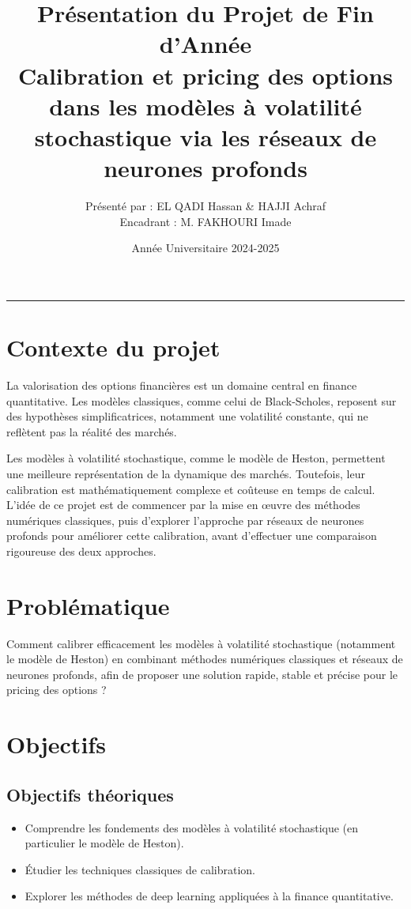 \documentclass[11pt,a4paper]{article}
\title{
    \textbf{Présentation du Projet de Fin d’Année} \\
    \vspace{0.4cm}
    Calibration et pricing des options dans les modèles à volatilité stochastique via les réseaux de neurones profonds
}
\author{
    Présenté par : EL QADI Hassan \& HAJJI Achraf \\
    Encadrant : M. FAKHOURI Imade
}
\date{Année Universitaire 2024-2025}
\begin{document}
\maketitle
\vspace{-1em}
\hrule
\vspace{1em}

\section{Contexte du projet}
La valorisation des options financières est un domaine central en finance quantitative. Les modèles classiques, comme celui de Black-Scholes, reposent sur des hypothèses simplificatrices, notamment une volatilité constante, qui ne reflètent pas la réalité des marchés.

Les modèles à volatilité stochastique, comme le modèle de Heston, permettent une meilleure représentation de la dynamique des marchés. Toutefois, leur calibration est mathématiquement complexe et coûteuse en temps de calcul. L’idée de ce projet est de commencer par la mise en œuvre des méthodes numériques classiques, puis d’explorer l’approche par réseaux de neurones profonds pour améliorer cette calibration, avant d'effectuer une comparaison rigoureuse des deux approches.

\section{Problématique}
Comment calibrer efficacement les modèles à volatilité stochastique (notamment le modèle de Heston) en combinant méthodes numériques classiques et réseaux de neurones profonds, afin de proposer une solution rapide, stable et précise pour le pricing des options ?

\section{Objectifs}
\subsection*{Objectifs théoriques}
\begin{itemize}[label=--]
    \item Comprendre les fondements des modèles à volatilité stochastique (en particulier le modèle de Heston).
    \item Étudier les techniques classiques de calibration.
    \item Explorer les méthodes de deep learning appliquées à la finance quantitative.
\end{itemize}
\end{document}
